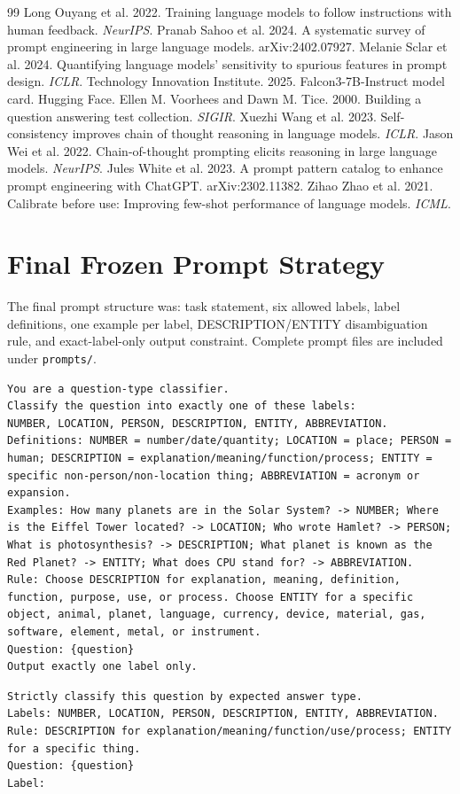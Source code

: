 \documentclass[10pt,twocolumn]{article}
\begin{document}
\begin{thebibliography}{99}
 Long Ouyang et al. 2022. Training language models to follow instructions with human feedback. \textit{NeurIPS}.
 Pranab Sahoo et al. 2024. A systematic survey of prompt engineering in large language models. arXiv:2402.07927.
 Melanie Sclar et al. 2024. Quantifying language models' sensitivity to spurious features in prompt design. \textit{ICLR}.
 Technology Innovation Institute. 2025. Falcon3-7B-Instruct model card. Hugging Face.
 Ellen M. Voorhees and Dawn M. Tice. 2000. Building a question answering test collection. \textit{SIGIR}.
 Xuezhi Wang et al. 2023. Self-consistency improves chain of thought reasoning in language models. \textit{ICLR}.
 Jason Wei et al. 2022. Chain-of-thought prompting elicits reasoning in large language models. \textit{NeurIPS}.
 Jules White et al. 2023. A prompt pattern catalog to enhance prompt engineering with ChatGPT. arXiv:2302.11382.
 Zihao Zhao et al. 2021. Calibrate before use: Improving few-shot performance of language models. \textit{ICML}.
\end{thebibliography}
\appendix
\onecolumn
\section{Final Frozen Prompt Strategy}
The final prompt structure was: task statement, six allowed labels, label definitions, one example per label, DESCRIPTION/ENTITY disambiguation rule, and exact-label-only output constraint. Complete prompt files are included under \texttt{prompts/}.
\begin{lstlisting}[caption={Final English prompt skeleton.}]
You are a question-type classifier.
Classify the question into exactly one of these labels:
NUMBER, LOCATION, PERSON, DESCRIPTION, ENTITY, ABBREVIATION.
Definitions: NUMBER = number/date/quantity; LOCATION = place; PERSON = human; DESCRIPTION = explanation/meaning/function/process; ENTITY = specific non-person/non-location thing; ABBREVIATION = acronym or expansion.
Examples: How many planets are in the Solar System? -> NUMBER; Where is the Eiffel Tower located? -> LOCATION; Who wrote Hamlet? -> PERSON; What is photosynthesis? -> DESCRIPTION; What planet is known as the Red Planet? -> ENTITY; What does CPU stand for? -> ABBREVIATION.
Rule: Choose DESCRIPTION for explanation, meaning, definition, function, purpose, use, or process. Choose ENTITY for a specific object, animal, planet, language, currency, device, material, gas, software, element, metal, or instrument.
Question: {question}
Output exactly one label only.
\end{lstlisting}
\begin{lstlisting}[caption={Compact Gemini prompt skeleton.}]
Strictly classify this question by expected answer type.
Labels: NUMBER, LOCATION, PERSON, DESCRIPTION, ENTITY, ABBREVIATION.
Rule: DESCRIPTION for explanation/meaning/function/use/process; ENTITY for a specific thing.
Question: {question}
Label:
\end{lstlisting}
\end{document}
